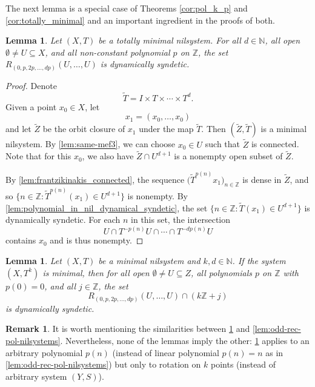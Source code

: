 \documentclass{article}
\theoremstyle{plain}
\newtheorem{lemma}[Theorem]{Lemma}
\theoremstyle{claim}
\theoremstyle{definition}
\newtheorem{remark}[Theorem]{Remark}
\theoremstyle{plain}
\theoremstyle{plain}
\newcommand{\N}{\mathbb{N}}
\newcommand{\Z}{\mathbb{Z}}
\newcommand{\1}{\boldsymbol{1}}
\begin{document}
The next lemma is a special case of Theorems \ref{cor:pol_k_p} and \ref{cor:totally_minimal} and an important ingredient in the proofs of both.

\begin{lemma}\label{lem:totall_minimal_nilsystems}
    Let $(X,T)$ be a totally minimal nilsystem. For all $d \in \N$, all open $\emptyset\neq U\subseteq X$, and all non-constant polynomial $p$ on $\Z$, the set $R_{(0,p,2p,\ldots,dp)} (U, \ldots, U)$ is dynamically syndetic.
\end{lemma}

\begin{proof}
Denote 
\[
    \tilde{T} = I \times T \times \cdots \times T^d.
\]
Given a point $x_0 \in X$, let  
\[
    x_1 = (x_0, \ldots, x_0)
\]
 and let $\tilde{Z}$ be the orbit closure of $x_1$ under the map $\tilde{T}$. Then $(\tilde{Z}, \tilde{T})$ is a minimal nilsystem. 
By \cref{lem:same-mef3}, we can choose $x_0 \in U$ such that $\tilde{Z}$ is connected. Note that for this $x_0$, we also have $\tilde{Z} \cap U^{d+1}$ is a nonempty open subset of $\tilde{Z}$. 

By \cref{lem:frantzikinakis_connected}, the sequence $\big(\tilde{T}^{p(n)} x_1\big)_{n\in\Z}$ is dense in $\tilde{Z}$, and so $\{n \in \Z: \tilde{T}^{p(n)}(x_1) \in U^{d+1}\}$ is nonempty. By \cref{lem:polynomial_in_nil_dynamical_syndetic}, the set $\{n \in \Z: \tilde{T}(x_1) \in U^{d+1}\}$ is dynamically syndetic. For each
$n$ in this set, the intersection
$$U\cap T^{-p(n)}U\cap\cdots\cap T^{-dp(n)}U$$
contains $x_0$ and is thus nonempty.
\end{proof}

\begin{lemma}
\label{lem:odd-rec-pol-nilsystems-ap}
Let $(X, T)$ be a minimal nilsystem and $k, d \in \N$.  If the system $(X,T^k)$ is minimal, then for all open $\emptyset\neq U \subseteq Z$, all polynomials $p$ on $\Z$ with $p(0) = 0$, and all $j \in \Z$, the set
\[
    R_{(0,p,2p,\ldots,dp)} (U,\ldots,U) \cap (k \Z + j)
\]
is dynamically syndetic.   
\end{lemma}
\begin{remark}
It is worth mentioning the similarities between \cref{lem:odd-rec-pol-nilsystems-ap} and \cref{lem:odd-rec-pol-nilsystems}. Nevertheless, none of the lemmas imply the other: \cref{lem:odd-rec-pol-nilsystems-ap} applies to an arbitrary polynomial $p(n)$ (instead of linear polynomial $p(n) = n$ as in \cref{lem:odd-rec-pol-nilsystems}) but only to rotation on $k$ points (instead of arbitrary system $(Y, S)$).
\end{remark}
\end{document}
